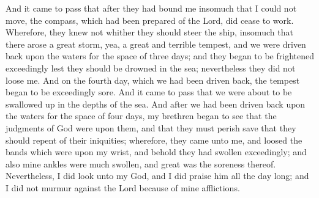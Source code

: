 \bverse \iffalse And it came to pass that after they had bound me insomuch that I could not move, the compass, which had been prepared of the Lord, did cease to work. \fi
And it came to pass that after they had bound me insomuch that I could not move, the compass, which had been prepared of the Lord, did cease to work.
\bverse \iffalse Wherefore, they knew not whither they should steer the ship, insomuch that there arose a great storm, yea, a great and terrible tempest, and we were driven back upon the waters for the space of three days; and they began to be frightened exceedingly lest they should be drowned in the sea; nevertheless they did not loose me. \fi
Wherefore, they knew not whither they should steer the ship, insomuch that there arose a great storm, yea, a great and terrible tempest, and we were driven back upon the waters for the space of three days; and they began to be frightened exceedingly lest they should be drowned in the sea; nevertheless they did not loose me.
\bverse \iffalse And on the fourth day, which we had been driven back, the tempest began to be exceedingly sore. \fi
And on the fourth day, which we had been driven back, the tempest began to be exceedingly sore.
\bverse \iffalse And it came to pass that we were about to be swallowed up in the depths of the sea. And after we had been driven back upon the waters for the space of four days, my brethren began to see that the judgments of God were upon them, and that they must perish save that they should repent of their iniquities; wherefore, they came unto me, and loosed the bands which were upon my wrist, and behold they had swollen exceedingly; and also mine ankles were much swollen, and great was the soreness thereof. \fi
And it came to pass that we were about to be swallowed up in the depths of the sea. And after we had been driven back upon the waters for the space of four days, my brethren began to see that the judgments of God were upon them, and that they must perish save that they should repent of their iniquities; wherefore, they came unto me, and loosed the bands which were upon my wrist, and behold they had swollen exceedingly; and also mine ankles were much swollen, and great was the soreness thereof.
\bverse \iffalse Nevertheless, I did look unto my God, and I did praise him all the day long; and I did not murmur against the Lord because of mine afflictions. \fi
Nevertheless, I did look unto my God, and I did praise him all the day long; and I did not murmur against the Lord because of mine afflictions.
